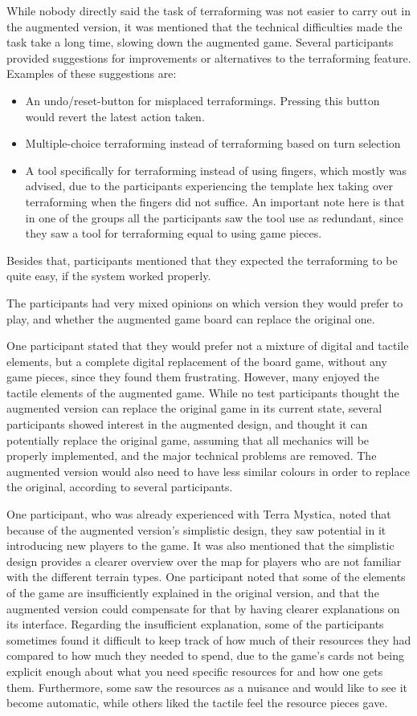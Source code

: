 While nobody directly said the task of terraforming was not easier to carry out in the augmented version, it was mentioned that the technical difficulties made the task take a long time, slowing down the augmented game. Several participants provided suggestions for improvements or alternatives to the terraforming feature. Examples of these suggestions are:
\begin{itemize}
\item An undo/reset-button for misplaced terraformings. Pressing this button would revert the latest action taken.
\item Multiple-choice terraforming instead of terraforming based on turn selection
\item A tool specifically for terraforming instead of using fingers, which mostly was advised, due to the participants experiencing the template hex taking over terraforming when the fingers did not suffice. An important note here is that in one of the groups all the participants saw the tool use as redundant, since they saw a tool for terraforming equal to using game pieces.
\end{itemize}
Besides that, participants mentioned that they expected the terraforming to be quite easy, if the system worked properly. 

The participants had very mixed opinions on which version they would prefer to play, and whether the augmented game board can replace the original one.

One participant stated that they would prefer not a mixture of digital and tactile elements, but a complete digital replacement of the board game, without any game pieces, since they found them frustrating. However, many enjoyed the tactile elements of the augmented game. While no test participants thought the augmented version can replace the original game in its current state, several participants showed interest in the augmented design, and thought it can potentially replace the original game, assuming that all mechanics will be properly implemented, and the major technical problems are removed. The augmented version would also need to have less similar colours in order to replace the original, according to several participants.

One participant, who was already experienced with Terra Mystica, noted that because of the augmented version’s simplistic design, they saw potential in it introducing new players to the game. It was also mentioned that the simplistic design provides a clearer overview over the map for players who are not familiar with the different terrain types. One participant noted that some of the elements of the game are insufficiently explained in the original version, and that the augmented version could compensate for that by having clearer explanations on its interface. Regarding the insufficient explanation, some of the participants sometimes found it difficult to keep track of how much of their resources they had compared to how much they needed to spend, due to the game's cards not being explicit enough about what you need specific resources for and how one gets them. Furthermore, some saw the resources as a nuisance and would like to see it become automatic, while others liked the tactile feel the resource pieces gave.

